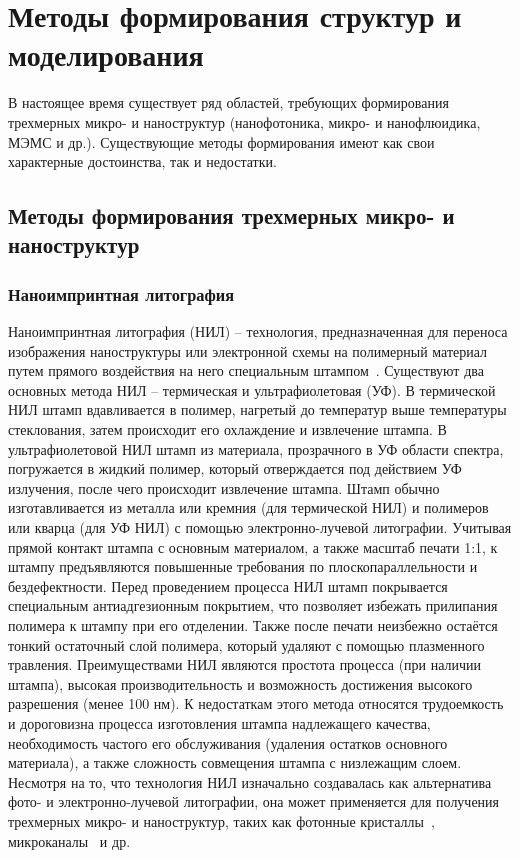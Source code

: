 \chapter{Методы формирования структур и моделирования} \label{chapter:methods}

В настоящее время существует ряд областей, требующих формирования трехмерных микро- и наноструктур (нанофотоника, микро- и нанофлюидика, МЭМС и др.). Существующие методы формирования имеют как свои характерные достоинства, так и недостатки.

\section{Методы формирования трехмерных микро- и наноструктур}

\subsection{Наноимпринтная литография}
Наноимпринтная литография (НИЛ) -- технология, предназначенная для переноса изображения наноструктуры или электронной схемы на полимерный материал путем прямого воздействия на него специальным штампом~\cite{NIL_1, NIL_2}. Существуют два основных метода НИЛ -- термическая и ультрафиолетовая (УФ). В термической НИЛ штамп вдавливается в полимер, нагретый до температур выше температуры стеклования, затем происходит его охлаждение и извлечение штампа. В ультрафиолетовой НИЛ штамп из материала, прозрачного в УФ области спектра, погружается в жидкий полимер, который отверждается под действием УФ излучения, после чего происходит извлечение штампа. Штамп обычно изготавливается из металла или кремния (для термической НИЛ) и полимеров или кварца (для УФ НИЛ) с помощью электронно-лучевой литографии. Учитывая прямой контакт штампа с основным материалом, а также масштаб печати 1:1, к штампу предъявляются повышенные требования по плоскопараллельности и бездефектности.  Перед проведением процесса НИЛ штамп покрывается специальным антиадгезионным покрытием, что позволяет избежать прилипания полимера к штампу при его отделении. Также после печати неизбежно остаётся тонкий остаточный слой полимера, который удаляют с помощью плазменного травления. Преимуществами НИЛ являются простота процесса (при наличии штампа), высокая производительность и возможность достижения высокого разрешения (менее 100 нм). К недостаткам этого метода относятся трудоемкость и дороговизна процесса изготовления штампа надлежащего качества, необходимость частого его обслуживания (удаления остатков основного материала), а также сложность совмещения штампа с низлежащим слоем. Несмотря на то, что технология НИЛ изначально создавалась как альтернатива фото- и электронно-лучевой литографии, она может применяется для получения трехмерных микро- и наноструктур, таких как фотонные кристаллы~\cite{NIL_nanophotonics}, микроканалы~\cite{NIL_microfluidics} и др.~\cite{NIL_3D_1, NIL_3D_2}

